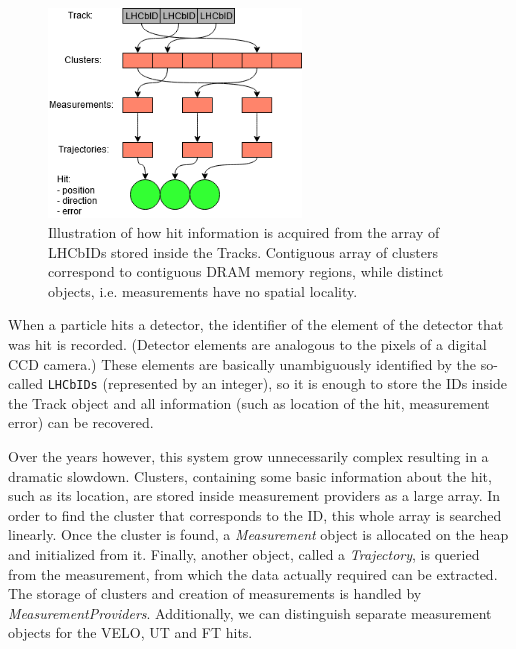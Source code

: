 \documentclass[12pt]{article}
\newcommand{\code}[1]{\texttt{#1}}
\begin{document}
\begin{figure}[H]
	\begin{center}
		\includegraphics[width=0.6\textwidth]{kalmanfit_loadhits_schematic}
	\end{center}
	\caption[Loading of track data from LHCbIDs]{Illustration of how hit information is acquired from the array of LHCbIDs stored inside the Tracks. Contiguous array of clusters correspond to contiguous DRAM memory regions, while distinct objects, i.e. measurements have no spatial locality.}
	\label{fig_kalmanfit_loadhits_schematic}
\end{figure}

When a particle hits a detector, the identifier of the element of the detector that was hit is recorded. (Detector elements are analogous to the pixels of a digital CCD camera.) These elements are basically unambiguously identified by the so-called \code{LHCbIDs} (represented by an integer), so it is enough to store the IDs inside the Track object and all information (such as location of the hit, measurement error) can be recovered. 

Over the years however, this system grow unnecessarily complex resulting in a dramatic slowdown. Clusters, containing some basic information about the hit, such as its location, are stored inside measurement providers as a large array. In order to find the cluster that corresponds to the ID, this whole array is searched linearly. Once the cluster is found, a \textit{Measurement} object is allocated on the heap and initialized from it. Finally, another object, called a \textit{Trajectory}, is queried from the measurement, from which the data actually required can be extracted. The storage of clusters and creation of measurements is handled by \textit{MeasurementProviders}. Additionally, we can distinguish separate measurement objects for the VELO, UT and FT hits.
\end{document}
